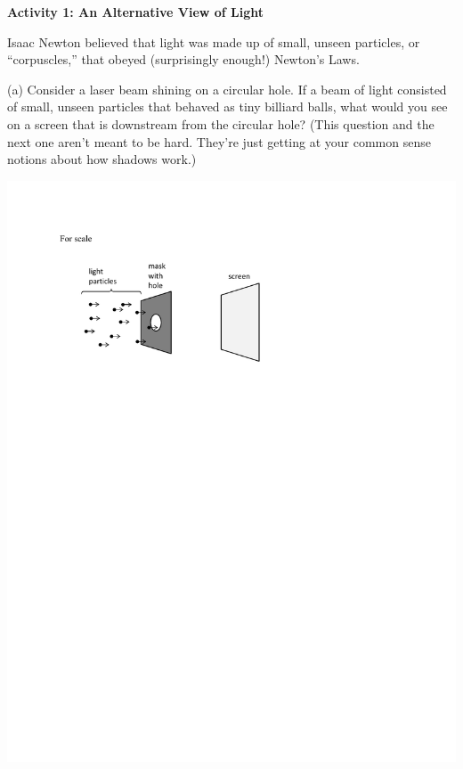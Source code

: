 \medskip
\textbf{Activity 1: An Alternative View of Light}

Isaac Newton believed that light was made up of small, unseen particles, or ``corpuscles,''
that obeyed (surprisingly enough!) Newton's Laws. 


(a) Consider a laser beam shining on a circular hole. If a beam of
light consisted of small, unseen particles that behaved as tiny billiard
balls, what would you see on a screen that is downstream from the circular
hole?  (This question and the next one aren't meant to be hard.
They're just getting at your common sense notions about how shadows work.)

{\centering \includegraphics[scale=0.85]{interference_of_light/circular_hole.pdf} \par}

